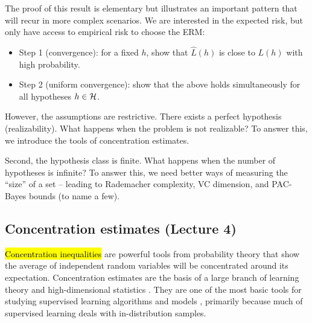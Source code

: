 The proof of this result is elementary but illustrates an important pattern that will recur in more complex scenarios.
We are interested in the expected risk, but only have access to empirical risk to choose the ERM:
\begin{itemize}
    \item Step 1 (convergence): for a fixed $h$, show that $\hat L(h)$ is close to $L(h)$ with high probability.
    \item Step 2 (uniform convergence): show that the above holds simultaneously for all hypotheses $h \in \mathcal{H}$.
\end{itemize}
However, the assumptions are restrictive.
There exists a perfect hypothesis (realizability). What happens when the problem is not realizable? To answer this, we introduce the tools of concentration estimates.

Second, the hypothesis class is finite. What happens when the number of hypotheses is infinite?
To answer this, we need better ways of measuring the ``size'' of a set -- leading to Rademacher complexity, VC dimension, and PAC-Bayes bounds (to name a few).





\subsection{Concentration estimates (Lecture 4)}

\hl{Concentration inequalities} are powerful tools from probability theory that show the average of independent random variables will be concentrated around its expectation.
Concentration estimates are the basis of a large branch of learning theory \citep{bach2024learning} and high-dimensional statistics \citep{wainwright2019high}.
They are one of the most basic tools for studying supervised learning algorithms and models \citep{zhang2023mathematical}, primarily because much of supervised learning deals with in-distribution samples.

